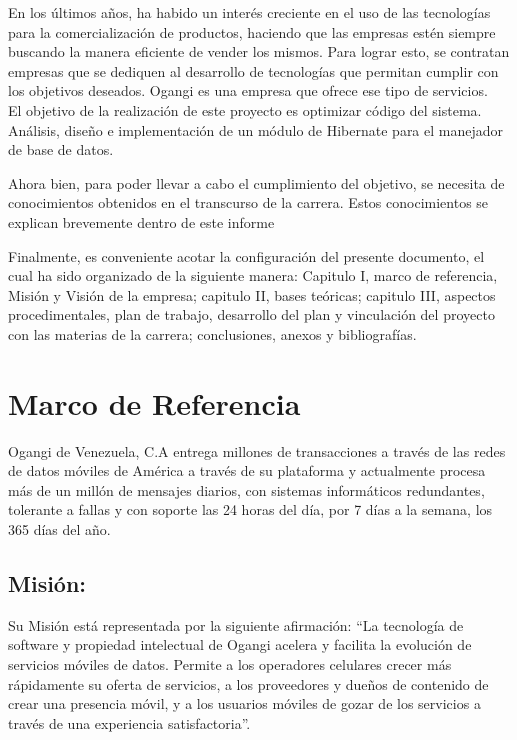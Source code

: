 \documentclass[12pt,oneside]{book}
\begin{document}
	En los últimos años, ha habido un interés creciente en el uso de las tecnologías para la comercialización de productos, haciendo que las empresas estén siempre buscando la manera eficiente de vender los mismos. Para lograr esto, se contratan empresas que se dediquen al desarrollo de tecnologías que permitan cumplir con los objetivos deseados. Ogangi es una empresa que ofrece ese tipo de servicios. \\
	
	El objetivo de la realización de este proyecto es optimizar código del sistema. Análisis, diseño e implementación de un módulo de Hibernate para el manejador de base de datos.  
	
	Ahora bien, para poder llevar a cabo el cumplimiento del objetivo, se necesita de conocimientos obtenidos en el transcurso de la carrera. Estos conocimientos se explican brevemente dentro de este informe 
	
	Finalmente, es conveniente acotar la configuración del presente documento, el cual ha sido organizado de la siguiente manera: Capitulo I, marco de referencia, Misión y Visión de la empresa; capitulo II, bases teóricas; capitulo III, aspectos procedimentales, plan de trabajo, desarrollo del plan y vinculación del proyecto con las materias de la carrera; conclusiones, anexos y bibliografías.
	
	\afterpreface 
	
	\pagestyle{fancyplain}
	\renewcommand{\chaptermark}[1]{\markboth{#1}{\textsc{\footnotesize\thechapter\ #1}}}
	\renewcommand{\sectionmark}[1]{\markright{\textsc{\footnotesize\thesection\ #1}}}
	\lhead[\fancyplain{}{\textsc{\footnotesize\thepage}}]%
	{\fancyplain{}{\rightmark}}
	\rhead[\fancyplain{}{\leftmark}]%
	{\fancyplain{}{\textsc{\footnotesize\thepage}}} \cfoot{}
	
	\mainmatter
	
	\chapter{Marco de Referencia}

	Ogangi de Venezuela, C.A entrega millones de transacciones a través de las redes de
	datos móviles de América a través de su plataforma y actualmente procesa más de un millón de
	mensajes diarios, con sistemas informáticos redundantes, tolerante a fallas y con soporte las 24
	horas del día, por 7 días a la semana, los 365 días del año.	
	
	\section{Misión:}
	Su Misión está representada por la siguiente afirmación:
	“La tecnología de software y propiedad intelectual de Ogangi acelera y facilita la evolución
	de servicios móviles de datos. Permite a los operadores celulares crecer más rápidamente su
	oferta de servicios, a los proveedores y dueños de contenido de crear una presencia móvil, y a
	los usuarios móviles de gozar de los servicios a través de una experiencia satisfactoria”.
	
\end{document}
